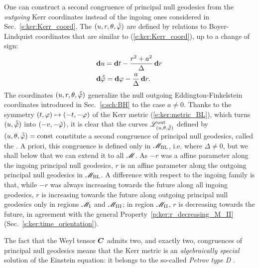 One can construct a second congruence of principal null geodesics from
the \emph{outgoing} Kerr coordinates instead of the ingoing ones
considered in Sec.~\ref{s:ker:Kerr_coord}. The
$(u,r,\theta,\tilde{{\tilde\varphi}})$ are defined by relations to Boyer-Lindquist
coordinates that are similar to
(\ref{e:ker:Kerr_coord}), up to a change of sign:
\begin{subequations}
\label{e:ker:out_Kerr_coord}
\begin{align}
& \mathbf{d} u = \mathbf{d} t - \frac{r^2+a^2}{\Delta} \, \mathbf{d} r \\
& \mathbf{d} \tilde{{\tilde\varphi}} = \mathbf{d} \varphi - \frac{a}{\Delta}\, \mathbf{d} r .
\end{align}
\end{subequations}
The coordinates $(u,r,\theta,\tilde{{\tilde\varphi}})$ generalize the null
outgoing Eddington-Finkelstein
coordinates introduced in Sec.~\ref{s:sch:BH} to the case $a\not=0$.
Thanks to the symmetry $(t,\varphi)\mapsto(-t,-\varphi)$ of the Kerr metric (\ref{e:ker:metric_BL}), which turns $(u,\tilde{{\tilde\varphi}})$ into $(-v,-{\tilde\varphi})$, it is clear that the
curves $\mathscr{L}^{\rm out}_{(u,\theta,\tilde{{\tilde\varphi}})}$
defined by $(u,\theta,\tilde{{\tilde\varphi}})=\mathrm{const}$ constitute a second
congruence of principal null geodesics, called the .
A priori, this congruence is defined only in $\mathscr{M}_{\rm BL}$, i.e. where $\Delta\neq 0$,
but we shall below that we can extend it to all $\mathscr{M}$.
As $-r$ was a affine parameter along
the ingoing principal null geodesics, $r$ is an affine parameter along
the outgoing principal null geodesics in $\mathscr{M}_{\rm BL}$.
A difference with respect to the ingoing family is that, while $-r$ was always
increasing towards the future along all ingoing geodesics,
 $r$ is increasing towards the future
along outgoing principal null geodesics only in regions
$\mathscr{M}_{\rm I}$ and $\mathscr{M}_{\rm III}$; in region $\mathscr{M}_{\rm II}$,
$r$ is decreasing towards the future, in agreement with the general
Property~\ref{p:ker:r_decreasing_M_II} (Sec.~\ref{s:ker:time_orientation}).

The fact that the Weyl tensor $\bm{C}$
admits two, and exactly two, congruences of principal null geodesics
means that the Kerr metric is an \emph{algebraically special} solution of
the Einstein equation: it belongs to the so-called \emph{Petrov type D}
\cite{ONeil95}.

